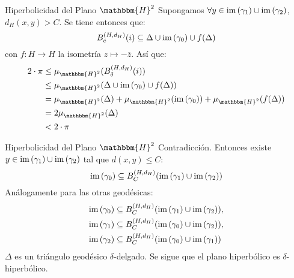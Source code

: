 \documentclass[xcolor=dvipsnames,aspectratio=159]{beamer}
\theoremstyle{largebreak}
\newcommand\cf[3]{\ensuremath{#1:#2\rightarrow#3}}
\newcommand{\bbm}[1]{\ensuremath{\mathbbm{#1}}}
\newcommand{\im}[1]{\ensuremath{\textup{im}\left(#1\right)}}
\begin{document}
\begin{frame}{Hiperbolicidad del Plano $\bbm{H}^2$}
    Supongamos $\forall y\in\im{\gamma_1}\cup\im{\gamma_2}$, $d_H(x,y)>C$. Se tiene entonces que:
    \begin{equation*}
        B_c^{(H,d_H)}(i)\subseteq \Delta\cup\im{\gamma_0}\cup f(\Delta)
    \end{equation*}
    \pause
    con $\cf{f}{H}{H}$ la isometría $z\mapsto-\overline{z}$.
    \pause
    Así que:
    \begin{equation*}
        \begin{split}
            2\cdot\pi&\leq\mu_{\bbm{H}^2}(B_{\delta}^{(H,d_H)}(i))\\
            &\leq\mu_{\bbm{H}^2}(\Delta\cup\im{\gamma_0}\cup f(\Delta))\\
            &=\mu_{\bbm{H}^2}(\Delta)+\mu_{\bbm{H}^2}(\im{\gamma_0})+\mu_{\bbm{H}^2}(f(\Delta))\\
            &=2\mu_{\bbm{H}^2}(\Delta)\\
            &< 2\cdot\pi\\
        \end{split}
    \end{equation*}
\end{frame}

\begin{frame}{Hiperbolicidad del Plano $\bbm{H}^2$}
    Contradicción. Entonces existe $y\in\im{\gamma_1}\cup\im{\gamma_2}$ tal que $d(x,y)\leq C$:
    \begin{equation*}
        \im{\gamma_0}\subseteq B_C^{(H,d_H)}( \im{\gamma_1}\cup\im{\gamma_2} )
    \end{equation*}
    \pause
    Análogamente para las otras geodésicas: %
    \begin{equation*}
        \begin{split}
            \im{\gamma_0}&\subseteq B_{C}^{(H,d_H)}(\im{\gamma_1}\cup\im{\gamma_2}),\\
            \im{\gamma_1}&\subseteq B_{C}^{(H,d_H)}(\im{\gamma_0}\cup\im{\gamma_2}),\\
            \im{\gamma_2}&\subseteq B_{C}^{(H,d_H)}(\im{\gamma_0}\cup\im{\gamma_1})\\
        \end{split}
    \end{equation*}
    \pause
    $\Delta$ es un triángulo geodésico $\delta$-delgado. Se sigue que el plano hiperbólico es $\delta$-hiperbólico.
\end{frame}
\end{document}
